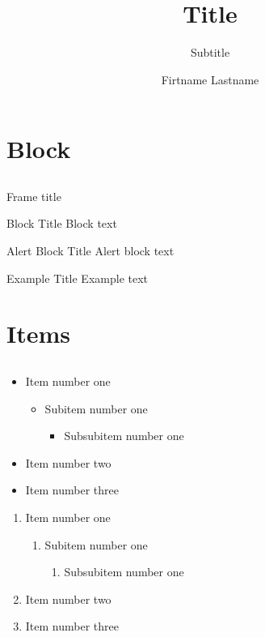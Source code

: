 \documentclass[12pt,a4paper]{beamer}
\title{Title}
\author{Firtname Lastname}
\subtitle{Subtitle}
\institute{Institue}
\begin{document}
\begin{frame}[plain]
	\maketitle
\end{frame}

\section{Block}
\subsection{}
\begin{frame}{Frame title}
	\begin{block}{Block Title}
		Block text
	\end{block}
	\begin{alertblock}{Alert Block Title}
		Alert block text
	\end{alertblock}
	\begin{example}{Example Title}
		Example text
	\end{example}
\end{frame}

\section{Items}
\subsection{}
\begin{frame}
	\begin{itemize}
		\item Item number one
		\begin{itemize}
			\item Subitem number one
			\begin{itemize}
				\item Subsubitem number one
			\end{itemize}
		\end{itemize}
		\item Item number two
		\item Item number three
	\end{itemize}
	\begin{enumerate}
		\item Item number one
		\begin{enumerate}
			\item Subitem number one
			\begin{enumerate}
				\item Subsubitem number one
			\end{enumerate}
		\end{enumerate}
		\item Item number two
		\item Item number three
	\end{enumerate}
\end{frame}
\end{document}
